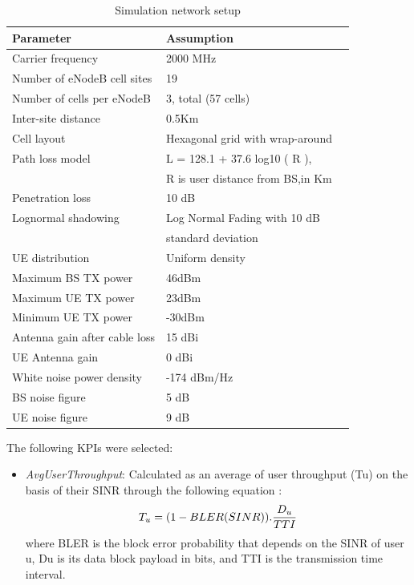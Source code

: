 \documentclass[conference]{IEEEtran}
\begin{document}
\begin{table}[!b]
\renewcommand{\arraystretch}{1.3}
\caption{Simulation network setup }
\label{simulation_setup}
\centering 
\begin{tabular}{@{}l|ll@{}}\hline
Parameter  &Assumption& \\\hline
Carrier frequency&2000 MHz\\
Number of eNodeB cell sites &19\\
Number of cells per eNodeB  &3,  total (57 cells)\\
Inter-site distance  &0.5Km\\
Cell layout&Hexagonal grid with wrap-around\\
Path loss model  &L = 128.1 + 37.6 log10 ( R ),  \\
&R is user distance from BS,in Km\\
Penetration loss&10 dB\\
Lognormal shadowing &Log Normal Fading with 10 dB \\
&standard deviation\\
UE distribution  &Uniform density\\
Maximum BS TX power &46dBm\\
Maximum UE TX power &23dBm\\
Minimum UE TX power &-30dBm\\
Antenna gain after cable loss&15 dBi\\
UE Antenna gain&0 dBi\\
White noise power density&-174 dBm/Hz\\
BS noise figure&5 dB\\
UE noise figure&9 dB\\\hline
\end{tabular}
\end{table}

The following KPIs were selected:
\begin{itemize}


\item \emph{AvgUserThroughput}: Calculated as an average of user throughput (Tu) on the basis of their SINR through the following equation \cite{4:A. Gomez-Andrades}:
   \begin{eqnarray}
              T_{u} = {(1-BLER(SINR))}.{D_u\over{TTI}    }      
              \label{eq:6}
              \end{eqnarray} 
where BLER is the block error probability that depends
on the SINR of user u, Du is its data block payload in
bits, and TTI is the transmission time interval.

\end{itemize}
\end{document}
